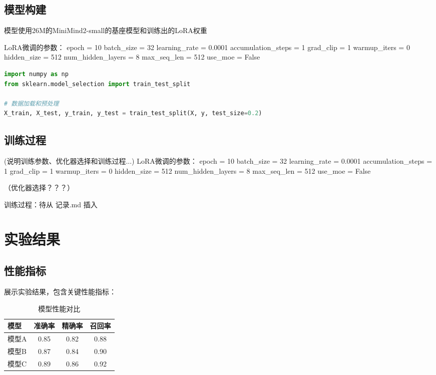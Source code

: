 \documentclass[a4paper,11pt]{article}
\begin{document}
\subsection{模型构建}
模型使用26M的MiniMind2-small的基座模型和训练出的LoRA权重

LoRA微调的参数：
epoch = 10
batch_size = 32
learning_rate = 0.0001
accumulation_steps = 1
grad_clip = 1
warmup_iters = 0
hidden_size = 512
num_hidden_layers = 8
max_seq_len = 512
use_moe = False


\begin{lstlisting}[language=Python, caption=示例代码]
import numpy as np
from sklearn.model_selection import train_test_split

# 数据加载和预处理
X_train, X_test, y_train, y_test = train_test_split(X, y, test_size=0.2)
\end{lstlisting}

\subsection{训练过程}
(说明训练参数、优化器选择和训练过程...)
LoRA微调的参数：
epoch = 10
batch_size = 32
learning_rate = 0.0001
accumulation_steps = 1
grad_clip = 1
warmup_iters = 0
hidden_size = 512
num_hidden_layers = 8
max_seq_len = 512
use_moe = False

（优化器选择？？？）

训练过程：待从 记录.md 插入

\section{实验结果}
\subsection{性能指标}
展示实验结果，包含关键性能指标：

\begin{table}[h]
    \centering
    \caption{模型性能对比}
    \begin{tabular}{lccc}
        \toprule
        模型 & 准确率 & 精确率 & 召回率 \\
        \midrule
        模型A & 0.85 & 0.82 & 0.88 \\
        模型B & 0.87 & 0.84 & 0.90 \\
        模型C & 0.89 & 0.86 & 0.92 \\
        \bottomrule
    \end{tabular}
\end{table}
\end{document}
